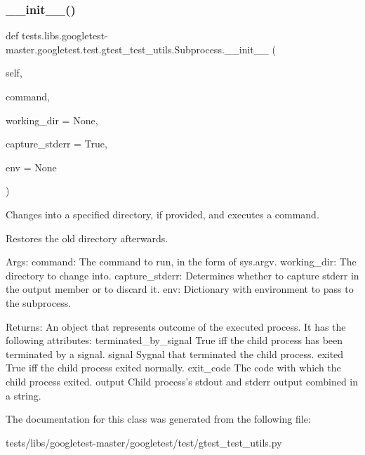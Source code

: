 \subsubsection{\texorpdfstring{\+\_\+\+\_\+init\+\_\+\+\_\+()}{\_\_init\_\_()}}
{\footnotesize\ttfamily def tests.\+libs.\+googletest-\/master.\+googletest.\+test.\+gtest\+\_\+test\+\_\+utils.\+Subprocess.\+\_\+\+\_\+init\+\_\+\+\_\+ (\begin{DoxyParamCaption}\item[{}]{self,  }\item[{}]{command,  }\item[{}]{working\+\_\+dir = {\ttfamily None},  }\item[{}]{capture\+\_\+stderr = {\ttfamily True},  }\item[{}]{env = {\ttfamily None} }\end{DoxyParamCaption})}

\begin{DoxyVerb}Changes into a specified directory, if provided, and executes a command.

Restores the old directory afterwards.

Args:
  command:        The command to run, in the form of sys.argv.
  working_dir:    The directory to change into.
  capture_stderr: Determines whether to capture stderr in the output member
              or to discard it.
  env:            Dictionary with environment to pass to the subprocess.

Returns:
  An object that represents outcome of the executed process. It has the
  following attributes:
terminated_by_signal   True iff the child process has been terminated
                       by a signal.
signal                 Sygnal that terminated the child process.
exited                 True iff the child process exited normally.
exit_code              The code with which the child process exited.
output                 Child process's stdout and stderr output
                       combined in a string.
\end{DoxyVerb}
 

The documentation for this class was generated from the following file\+:\begin{DoxyCompactItemize}
\item 
tests/libs/googletest-\/master/googletest/test/gtest\+\_\+test\+\_\+utils.\+py\end{DoxyCompactItemize}

